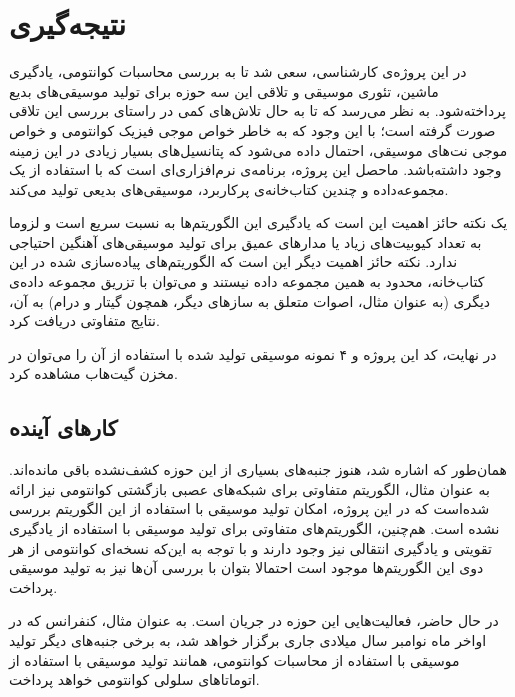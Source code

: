 \chapter{نتیجه‌گیری}

در این پروژه‌ی کارشناسی، سعی شد تا به بررسی محاسبات کوانتومی، یادگیری ماشین، تئوری موسیقی و تلاقی این سه حوزه برای تولید موسیقی‌های بدیع پرداخته‌شود. به نظر می‌رسد که تا به حال تلاش‌های کمی در راستای بررسی این تلاقی صورت گرفته است؛ با این وجود که به خاطر خواص موجی فیزیک کوانتومی و خواص موجی نت‌های موسیقی، احتمال داده می‌شود که پتانسیل‌های بسیار زیادی در این زمینه وجود داشته‌باشد.
ماحصل این پروژه، برنامه‌ی نرم‌افزاری‌ای است که با استفاده از یک مجموعه‌داده و چندین کتاب‌خانه‌ی پرکاربرد، موسیقی‌های بدیعی تولید می‌کند.

یک نکته حائز اهمیت این است که یادگیری این الگوریتم‌ها به نسبت سریع است و لزوما به تعداد کیوبیت‌های زیاد یا مدارهای عمیق برای تولید موسیقی‌های آهنگین احتیاجی ندارد.
نکته حائز اهمیت دیگر این است که الگوریتم‌های پیاده‌سازی شده در این کتاب‌خانه، محدود به همین مجموعه داده نیستند و می‌توان با تزریق مجموعه داده‌ی دیگری (به عنوان مثال، اصوات متعلق به سازهای دیگر، همچون گیتار و درام) به آن، نتایج متفاوتی دریافت کرد.

در نهایت، کد این پروژه و ۴ نمونه موسیقی تولید شده با استفاده از آن را می‌توان در مخزن گیت‌هاب
\cite{Maqenta}
مشاهده کرد.

\section{کارهای آینده}
همان‌طور که اشاره شد، هنوز جنبه‌های بسیاری از این حوزه کشف‌نشده باقی مانده‌اند. به عنوان مثال، الگوریتم متفاوتی
\cite{bausch2020recurrent}
برای شبکه‌های عصبی بازگشتی کوانتومی نیز ارائه شده‌است که در این پروژه، امکان تولید موسیقی با استفاده از این الگوریتم بررسی نشده است. هم‌چنین، الگوریتم‌های متفاوتی برای تولید موسیقی با استفاده از یادگیری تقویتی
و یادگیری انتقالی
نیز وجود دارند و با توجه به این‌که نسخه‌ای کوانتومی از هر دوی این الگوریتم‌ها موجود است
\cite{Mari_qtransfer}
\cite{Daoyi_QReinforce}
احتمالا بتوان با بررسی آن‌ها نیز به تولید موسیقی پرداخت.

در حال حاضر، فعالیت‌هایی این حوزه در جریان است. به عنوان مثال، کنفرانس
\cite{ISQCMC}
که در اواخر ماه نوامبر سال میلادی جاری برگزار خواهد شد، به برخی جنبه‌های دیگر تولید موسیقی با استفاده از محاسبات کوانتومی، همانند
تولید موسیقی با استفاده از اتوماتاهای سلولی کوانتومی
خواهد پرداخت.
